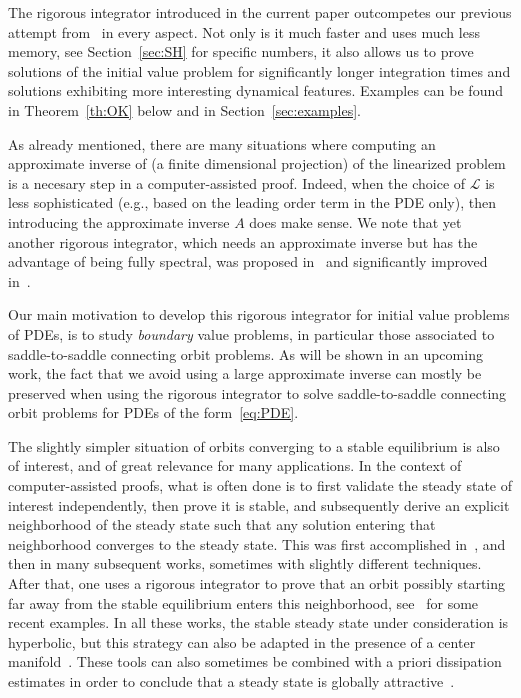 \documentclass[10pt,a4paper]{article}
\theoremstyle{plain}
\renewcommand{\L}{\mathcal{L}}
\newcommand{\1}{\mathbf{1}}
\begin{document}
The rigorous integrator introduced in the current paper outcompetes our previous attempt from~\cite{BerBreShe24} in every aspect. Not only is it much faster and uses much less memory, see Section~\ref{sec:SH} for specific numbers, it also allows us to prove solutions of the initial value problem for significantly longer integration times and solutions exhibiting more interesting dynamical features. Examples can be found in Theorem~\ref{th:OK} below and in Section~\ref{sec:examples}.

As already mentioned, there are many situations where computing an approximate inverse of (a finite dimensional projection) of the linearized problem is a necesary step in a computer-assisted proof. Indeed, when the choice of $\L$ is less sophisticated (e.g., based on the leading order term in the PDE only), then introducing the approximate inverse $A$ does make sense. 
We note that yet another rigorous integrator, which needs an approximate inverse but has the advantage of being fully spectral, was proposed in~\cite{CyrLes22} and significantly improved in~\cite{CadLes25}.

\medskip

Our main motivation to develop this rigorous integrator for initial value problems of PDEs, is to study \emph{boundary} value problems, in particular those associated to saddle-to-saddle connecting orbit problems. As will be shown in an upcoming work, the fact that we avoid using a large approximate inverse can mostly be preserved when using the rigorous integrator to solve saddle-to-saddle connecting orbit problems for PDEs of the form~\eqref{eq:PDE}.

The slightly simpler situation of orbits converging to a stable equilibrium is also of interest, and of great relevance for many applications. In the context of computer-assisted proofs, what is often done is to first validate the steady state of interest independently, then prove it is stable, and subsequently derive an explicit neighborhood of the steady state such that any solution entering that neighborhood converges to the steady state. This was first accomplished in~\cite{Zgl02bis}, and then in many subsequent works, sometimes with slightly different techniques. After that, one uses a rigorous integrator to prove that an orbit possibly starting far away from the stable equilibrium enters this neighborhood, see~\cite{DucLesTak25,CadLes25} for some recent examples. In all these works, the stable steady state under consideration is hyperbolic, but this strategy can also be adapted in the presence of a center manifold~\cite{JaqLesTak22}. These tools can also sometimes be combined with a priori dissipation estimates in order to conclude that a steady state is globally attractive~\cite{Cyr15}.
\end{document}
